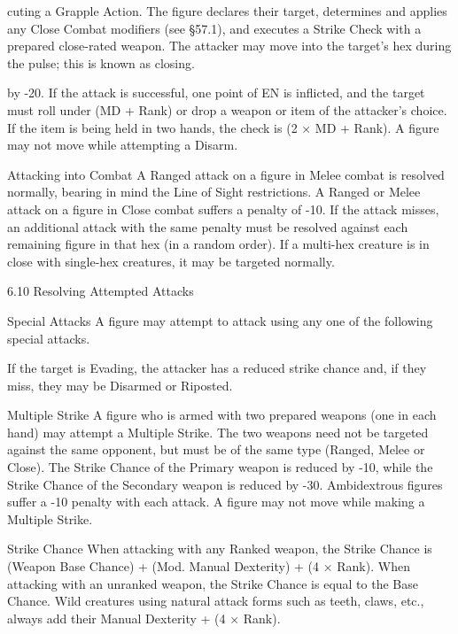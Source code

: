 \documentclass[a4paper]{article}
\begin{document}
\begin{multicols}{3}
cuting a Grapple Action. The figure declares their
target, determines and applies any Close Combat
modifiers (see §57.1), and executes a Strike Check
with a prepared close-rated weapon. The attacker
may move into the target’s hex during the pulse;
this is known as closing.

by -20. If the attack is successful, one point of EN
is inflicted, and the target must roll under (MD +
Rank) or drop a weapon or item of the attacker’s
choice. If the item is being held in two hands, the
check is (2 × MD + Rank). A figure may not move
while attempting a Disarm.

Attacking into Combat
A Ranged attack on a figure in Melee combat is
resolved normally, bearing in mind the Line of
Sight restrictions. A Ranged or Melee attack on a
figure in Close combat suffers a penalty of -10. If
the attack misses, an additional attack with the
same penalty must be resolved against each remaining figure in that hex (in a random order). If a
multi-hex creature is in close with single-hex creatures, it may be targeted normally.

6.10 Resolving Attempted Attacks

Special Attacks
A figure may attempt to attack using any one of the
following special attacks.

If the target is Evading, the attacker has a reduced
strike chance and, if they miss, they may be Disarmed or Riposted.

Multiple Strike A figure who is armed with two
prepared weapons (one in each hand) may attempt
a Multiple Strike. The two weapons need not be
targeted against the same opponent, but must be of
the same type (Ranged, Melee or Close). The
Strike Chance of the Primary weapon is reduced by
-10, while the Strike Chance of the Secondary
weapon is reduced by -30. Ambidextrous figures
suffer a -10 penalty with each attack. A figure may
not move while making a Multiple Strike.

Strike Chance
When attacking with any Ranked weapon, the
Strike Chance is (Weapon Base Chance) + (Mod.
Manual Dexterity) + (4 × Rank). When attacking
with an unranked weapon, the Strike Chance is
equal to the Base Chance. Wild creatures using
natural attack forms such as teeth, claws, etc.,
always add their Manual Dexterity + (4 × Rank).


\end{multicols}
\end{document}
